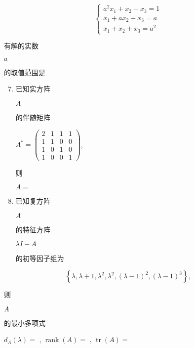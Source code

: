 \documentclass[10pt]{article}
\begin{document}
$$
\left\{\begin{array}{l}
a^{2} x_{1}+x_{2}+x_{3}=1 \\
x_{1}+a x_{2}+x_{3}=a \\
x_{1}+x_{2}+x_{3}=a^{2}
\end{array}\right.
$$
\begin{CJK}{UTF8}{mj}有解的实数\end{CJK} $a$ \begin{CJK}{UTF8}{mj}的取值范围是\end{CJK}

\begin{enumerate}
  \setcounter{enumi}{6}
  \item \begin{CJK}{UTF8}{mj}已知实方阵\end{CJK} $A$ \begin{CJK}{UTF8}{mj}的伴随矩阵\end{CJK} $A^{*}=\left(\begin{array}{llll}2 & 1 & 1 & 1 \\ 1 & 1 & 0 & 0 \\ 1 & 0 & 1 & 0 \\ 1 & 0 & 0 & 1\end{array}\right)$, \begin{CJK}{UTF8}{mj}则\end{CJK} $A=$

  \item \begin{CJK}{UTF8}{mj}已知复方阵\end{CJK} $A$ \begin{CJK}{UTF8}{mj}的特征方阵\end{CJK} $\lambda I-A$ \begin{CJK}{UTF8}{mj}的初等因子组为\end{CJK}

\end{enumerate}
$$
\left\{\lambda, \lambda+1, \lambda^{2}, \lambda^{2},(\lambda-1)^{2},(\lambda-1)^{3}\right\},
$$
\begin{CJK}{UTF8}{mj}则\end{CJK} $A$ \begin{CJK}{UTF8}{mj}的最小多项式\end{CJK} $d_{A}(\lambda)=$ , $\operatorname{rank}(A)=$ , $\operatorname{tr}(A)=$
\end{document}
